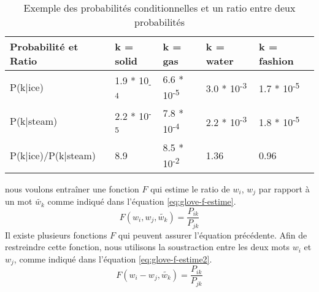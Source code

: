 \documentclass{KodeBook}
\begin{document}
\begin{table}[ht]
	\centering
	\begin{tabular}{lllll}
		\hline\hline
		\textbf{Probabilité et Ratio} & \textbf{k = solid} & \textbf{k = gas} & \textbf{k = water} & \textbf{k = fashion} \\
		\hline
		P(k|ice) & 1.9 * 10\textsubscript{-4} & 6.6 * 10\textsuperscript{-5} & 3.0 * 10\textsuperscript{-3} & 1.7 * 10\textsuperscript{-5} \\
		P(k|steam) & 2.2 * 10\textsuperscript{-5} & 7.8 * 10\textsuperscript{-4} & 2.2 * 10\textsuperscript{-3} & 1.8 * 10\textsuperscript{-5} \\
		\hline
		P(k|ice)/P(k|steam) & 8.9 & 8.5 * 10\textsuperscript{-2} & 1.36 & 0.96 \\
		\hline\hline
		
	\end{tabular}
	\caption[Exemple des probabilités conditionnelles et un ratio entre deux probabilités]{Exemple des probabilités conditionnelles et un ratio entre deux probabilités  \cite{2014-pennington-al}}
	\label{tab:glove-prob-exp}
\end{table}


nous voulons entraîner une fonction $F$ qui estime le ratio de $w_i$, $w_j$ par rapport à un mot $\tilde{w_k}$ comme indiqué dans l'équation \ref{eq:glove-f-estime}.
\begin{equation}
F(w_i, w_j, \tilde{w_k}) = \frac{P_{ik}}{P_{jk}}
\label{eq:glove-f-estime}
\end{equation}
Il existe plusieurs fonctions $F$ qui peuvent assurer l'équation précédente. 
Afin de restreindre cette fonction, nous utilisons la soustraction entre les deux mots $w_i$ et $w_j$, comme indiqué dans l'équation \ref{eq:glove-f-estime2}.
\begin{equation}
F(w_i - w_j, \tilde{w_k}) = \frac{P_{ik}}{P_{jk}}
\label{eq:glove-f-estime2}
\end{equation}
\end{document}
